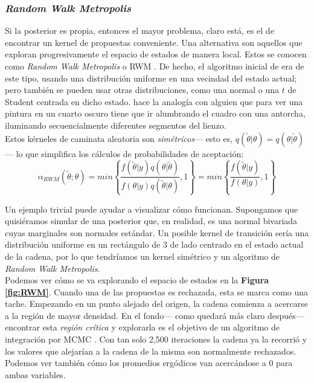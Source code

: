 \subsubsection*{\textit{Random Walk Metropolis}}

Si la posterior es propia, entonces el mayor problema, claro está, es el de encontrar un kernel de propuestas conveniente. Una alternativa son aquellos que exploran progresivamente el espacio de estados de manera local. Estos se conocen como \textit{Random Walk Metropolis} o RWM \parencite{RobertCasella10}. De hecho, el algoritmo inicial de \textcite{Metropolis53} era de este tipo, usando una distribución uniforme en una vecindad del estado actual; pero también se pueden usar otras distribuciones, como una normal o una $t$ de Student centrada en dicho estado. \textcite{Robert15} hace la analogía con alguien que para ver una pintura en un cuarto oscuro tiene que ir alumbrando el cuadro con una antorcha, iluminando secuencialmente diferentes segmentos del lienzo.\\

Estos kérneles de caminata aleatoria son \textit{simétricos}--- esto es,  $q(\tilde{\theta}|\theta) = q(\theta |\tilde{\theta})$--- lo que simplifica los cálculos de probabilidades de aceptación:
\begin{equation*}
\alpha_{RWM}(\tilde{\theta};\theta)=min\left\lbrace\dfrac{f(\tilde{\theta}|y)q(\theta|\tilde{\theta})}{f(\theta|y)q(\tilde{\theta}|\theta)},1\right\rbrace = min\left\lbrace\dfrac{f(\tilde{\theta}|y)}{f(\theta|y)},1\right\rbrace
\end{equation*}

Un ejemplo trivial puede ayudar a visualizar cómo funcionan. Supongamos que quisiéramos simular de una posterior que, en realidad, es una normal bivariada cuyas marginales son normales estándar. Un posible kernel de transición sería una distribución uniforme en un rectángulo de $3$ de lado centrado en el estado actual de la cadena, por lo que tendríamos un kernel simétrico y un algoritmo de \textit{Random Walk Metropolis}.\\ 

Podemos ver cómo se va explorando el espacio de estados en la \textbf{Figura \ref{fig:RWM}}. Cuando una de las propuestas es rechazada, esta se marca como una tache. Empezando en un punto alejado del origen, la cadena comienza a acercarse a la región de mayor densidad. En el fondo--- como quedará más claro después--- encontrar esta \textit{región crítica} y explorarla es el objetivo de un algoritmo de integración por MCMC \parencites{Neal93,Betancourt17}. Con tan solo 2,500 iteraciones la cadena ya la recorrió y los valores que alejarían a la cadena de la misma son normalmente rechazados. Podemos ver también cómo los promedios ergódicos van acercándose a $0$ para ambas variables.\\

